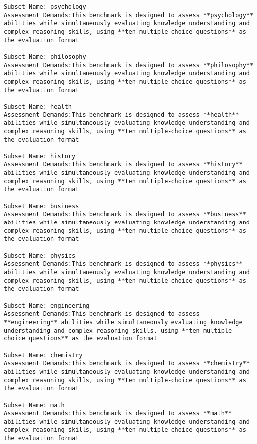 \begin{lstlisting}
Subset Name: psychology
Assessment Demands:This benchmark is designed to assess **psychology** abilities while simultaneously evaluating knowledge understanding and complex reasoning skills, using **ten multiple-choice questions** as the evaluation format

Subset Name: philosophy
Assessment Demands:This benchmark is designed to assess **philosophy** abilities while simultaneously evaluating knowledge understanding and complex reasoning skills, using **ten multiple-choice questions** as the evaluation format

Subset Name: health
Assessment Demands:This benchmark is designed to assess **health** abilities while simultaneously evaluating knowledge understanding and complex reasoning skills, using **ten multiple-choice questions** as the evaluation format

Subset Name: history
Assessment Demands:This benchmark is designed to assess **history** abilities while simultaneously evaluating knowledge understanding and complex reasoning skills, using **ten multiple-choice questions** as the evaluation format

Subset Name: business
Assessment Demands:This benchmark is designed to assess **business** abilities while simultaneously evaluating knowledge understanding and complex reasoning skills, using **ten multiple-choice questions** as the evaluation format

Subset Name: physics
Assessment Demands:This benchmark is designed to assess **physics** abilities while simultaneously evaluating knowledge understanding and complex reasoning skills, using **ten multiple-choice questions** as the evaluation format

Subset Name: engineering
Assessment Demands:This benchmark is designed to assess **engineering** abilities while simultaneously evaluating knowledge understanding and complex reasoning skills, using **ten multiple-choice questions** as the evaluation format

Subset Name: chemistry
Assessment Demands:This benchmark is designed to assess **chemistry** abilities while simultaneously evaluating knowledge understanding and complex reasoning skills, using **ten multiple-choice questions** as the evaluation format

Subset Name: math
Assessment Demands:This benchmark is designed to assess **math** abilities while simultaneously evaluating knowledge understanding and complex reasoning skills, using **ten multiple-choice questions** as the evaluation format


\end{lstlisting}
